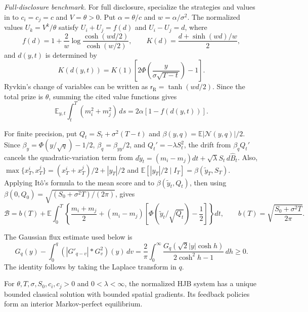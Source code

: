 \documentclass[mnsc]{informs3}
\begin{document}
\begin{APPENDICES}
{\emph{Full-disclosure benchmark.}
For full disclosure, specialize the strategies and values in
\citet[Propositions~1 and 3, equations~(18) and (23)]{Ryvkin2022Fight}
to $c_i=c_j=c$ and $V=\theta>0$.
Put $\alpha=\theta/c$ and $w=\alpha/\sigma^2$. The normalized values
$U_k=V^k/\theta$ satisfy
$U_i+U_j=f(d)$ and $U_i-U_j=d$, where
\begin{equation}\label{eq-design-full-values}
f(d)=1+\frac2w\log\frac{\cosh(wd/2)}{\cosh(w/2)},\qquad
K(d)=\frac{d+\sinh(wd)/w}{2},
\end{equation}
and $d(y,t)$ is determined by
\begin{equation}\label{eq-design-full-gap}
K(d(y,t))=K(1)
\left[2\Phi\!\left(\frac{y}{\sigma\sqrt{T-t}}\right)-1\right].
\end{equation}
Ryvkin's change of variables can be written as $\mathsf r_{\mathrm R}=\tanh(wd/2)$.
Since the total prize is $\theta$, summing the cited value functions gives
\begin{equation}\label{eq-design-full-energy}
\mathbb E_{y,t}\int_t^T(m_i^2+m_j^2)\,ds
=2\alpha[1-f(d(y,t))].
\end{equation}

For finite precision, put $Q_t=S_t+\sigma^2(T-t)$ and
$\beta(y,q)=\mathbb E|\mathcal N(y,q)|/2$.
Since $\beta_y=\Phi(y/\sqrt q)-1/2$, $\beta_q=\beta_{yy}/2$,
and $Q_t'=-\lambda S_t^2$, the drift from $\beta_qQ_t'$ cancels the
quadratic-variation term from
$d\tilde y_t=(m_i-m_j)dt+\sqrt\lambda S_t\,d\widehat B_t$.
Also,
$\max\{x_T^i,x_T^j\}=(x_T^i+x_T^j)/2+|y_T|/2$ and
$\mathbb E[|y_T|/2\mid I_T]=\beta(\tilde y_T,S_T)$. Applying It\^o's
formula to the mean score and to $\beta(\tilde y_t,Q_t)$, then using
$\beta(0,Q_0)=\sqrt{(S_0+\sigma^2T)/(2\pi)}$, gives
\begin{equation}\label{eq-best-output-drift-identity}
\mathcal B=b(T)+\mathbb E\int_0^T
\left\{\frac{m_i+m_j}{2}
+(m_i-m_j)\left[\Phi(\tilde y_t/\sqrt{Q_t})-\frac12\right]\right\}dt,
\qquad b(T)=\sqrt{\frac{S_0+\sigma^2T}{2\pi}}.
\end{equation}

The Gaussian flux estimate used below is
\begin{equation}\label{eq-design-gaussian-bilinear}
G_q(y)-\int_0^q(|G'_{q-v}|*G_v^2)(y)\,dv
=\frac2\pi\int_0^\infty
\frac{G_q(\sqrt2|y|\cosh h)}{2\cosh^2h-1}\,dh\geq0.
\end{equation}
The identity follows by taking the Laplace transform in $q$.

\begin{lemma}\label{lem-design-positive-equilibrium}
For $\theta,T,\sigma,S_0,c_i,c_j>0$ and $0<\lambda<\infty$, the normalized
HJB system has a unique bounded classical solution with bounded spatial
gradients. Its feedback policies form an interior Markov-perfect equilibrium.
\end{lemma}

}
\end{APPENDICES}
\end{document}
